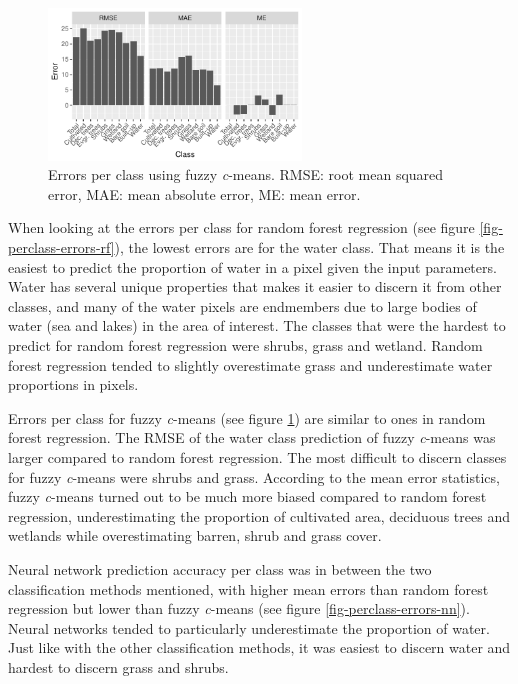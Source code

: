 \documentclass[a4paper,12pt]{scrbook}
\begin{document}
\begin{figure}
  \centering
  \includegraphics[width=0.6\textwidth]{thesis-figures/perclass-errors-cm}
  \caption{Errors per class using fuzzy \textit{c}-means. RMSE: root mean squared error, MAE: mean absolute error, ME: mean error.}
  \label{fig-perclass-errors-cm}
\end{figure}

When looking at the errors per class for random forest regression (see figure \ref{fig-perclass-errors-rf}), the lowest errors are for the water class. That means it is the easiest to predict the proportion of water in a pixel given the input parameters. Water has several unique properties that makes it easier to discern it from other classes, and many of the water pixels are endmembers due to large bodies of water (sea and lakes) in the area of interest. The classes that were the hardest to predict for random forest regression were shrubs, grass and wetland. Random forest regression tended to slightly overestimate grass and underestimate water proportions in pixels.

Errors per class for fuzzy \textit{c}-means (see figure \ref{fig-perclass-errors-cm}) are similar to ones in random forest regression. The RMSE of the water class prediction of fuzzy \textit{c}-means was larger compared to random forest regression. The most difficult to discern classes for fuzzy \textit{c}-means were shrubs and grass. According to the mean error statistics, fuzzy \textit{c}-means turned out to be much more biased compared to random forest regression, underestimating the proportion of cultivated area, deciduous trees and wetlands while overestimating barren, shrub and grass cover.

Neural network prediction accuracy per class was in between the two classification methods mentioned, with higher mean errors than random forest regression but lower than fuzzy \textit{c}-means (see figure \ref{fig-perclass-errors-nn}). Neural networks tended to particularly underestimate the proportion of water. Just like with the other classification methods, it was easiest to discern water and hardest to discern grass and shrubs.
\end{document}
